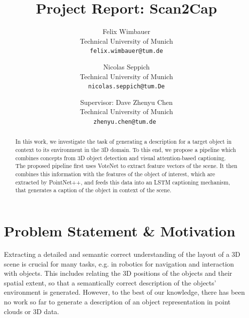 \documentclass[10pt,twocolumn,letterpaper]{article}
\begin{document}
\title{Project Report: Scan2Cap}

\author{Felix Wimbauer\\
Technical University of Munich\\
{\tt\small felix.wimbauer@tum.de}
\and
Nicolas Seppich\\
Technical University of Munich\\
{\tt\small nicolas.seppich@tum.De}
\and

\small
Supervisor: Dave Zhenyu Chen\\
\small
Technical University of Munich\\
{\tt\small zhenyu.chen@tum.de }
}

\maketitle

\begin{abstract}
In this work, we investigate the task of generating a description for a target object in context to its environment in the 3D domain. To this end, we propose a pipeline which combines concepts from 3D object detection and visual attention-based captioning. The proposed pipeline first uses VoteNet to extract feature vectors of the scene. It then combines this information with the features of the object of interest, which are extracted by PointNet++, and feeds this data into an LSTM captioning mechanism, that generates a caption of the object in context of the scene.
   
\end{abstract}

\section{Problem Statement \& Motivation}

Extracting a detailed and semantic correct understanding of the layout of a 3D scene is crucial for many tasks, e.g. in robotics for navigation and interaction with objects. This includes relating the 3D positions of the objects and their spatial extent, so that a semantically correct description of the objects' environment is generated.
However, to the best of our knowledge, there has been no work so far to generate a description of an object representation in point clouds or 3D data.
\end{document}
